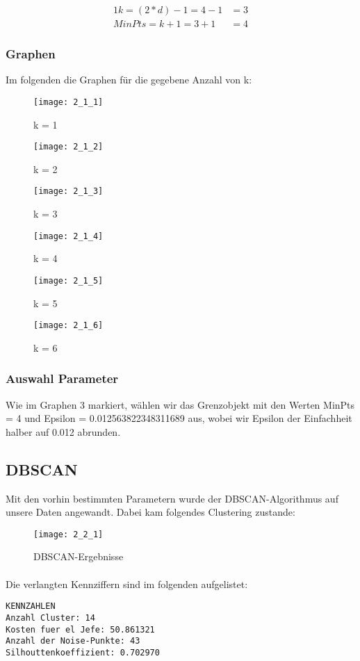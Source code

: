 \documentclass[a4paper]{article}
\begin{document}
\begin{alignat*}{1}
	k = (2 * d) - 1 = 4 - 1 &= 3 \\
	MinPts = k + 1 = 3 + 1 &= 4
\end{alignat*}

\subsubsection{Graphen}
Im folgenden die Graphen für die gegebene Anzahl von k:
\begin{figure}[h]
\caption{k = 1}
\texttt{[image: 2\_1\_1]}
\end{figure}
\begin{figure}[h]
\caption{k = 2}
\texttt{[image: 2\_1\_2]}
\end{figure}
\begin{figure}[h]
\caption{k = 3}
\texttt{[image: 2\_1\_3]}
\end{figure}
\begin{figure}[h]
\caption{k = 4}
\texttt{[image: 2\_1\_4]}
\end{figure}
\begin{figure}[h]
\caption{k = 5}
\texttt{[image: 2\_1\_5]}
\end{figure}
\begin{figure}[h]
\caption{k = 6}
\texttt{[image: 2\_1\_6]}
\end{figure}
\FloatBarrier
\subsubsection{Auswahl Parameter}
Wie im Graphen 3 markiert, wählen wir das Grenzobjekt mit den Werten MinPts = 4 und Epsilon = 0.012563822348311689 aus, wobei wir Epsilon der Einfachheit halber auf 0.012 abrunden.

\subsection{DBSCAN}
Mit den vorhin bestimmten Parametern wurde der DBSCAN-Algorithmus auf unsere Daten angewandt. Dabei kam folgendes Clustering zustande:
\begin{figure}[h]
\caption{DBSCAN-Ergebnisse}
\texttt{[image: 2\_2\_1]}
\end{figure}
\FloatBarrier
\paragraph{}
Die verlangten Kennziffern sind im folgenden aufgelistet:
\begin{lstlisting}
KENNZAHLEN
Anzahl Cluster: 14
Kosten fuer el Jefe: 50.861321
Anzahl der Noise-Punkte: 43
Silhouttenkoeffizient: 0.702970
\end{lstlisting}
\end{document}
